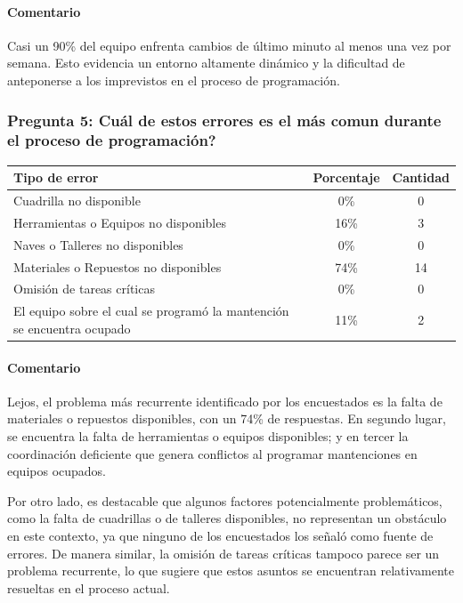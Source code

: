 \documentclass{article}
\begin{document}
\begin{appendix}
    \paragraph{Comentario} Casi un 90\% del equipo enfrenta cambios de último minuto al menos una vez por semana. Esto evidencia un entorno altamente dinámico y la dificultad de anteponerse a los imprevistos en el proceso de programación.
    
    
    \vspace{1.5em}
    \subsubsection*{Pregunta 5: Cuál de estos errores es el más comun durante el proceso de programación?}
    
    \begin{table}[htbp]
        \centering
        \begin{tabular}{p{7cm}cc}
            \toprule
            \textbf{Tipo de error} & \textbf{Porcentaje} & \textbf{Cantidad} \\
            \midrule
            Cuadrilla no disponible & 0\% & 0 \\
            Herramientas o Equipos no disponibles & 16\% & 3 \\
            Naves o Talleres no disponibles & 0\% & 0 \\
            Materiales o Repuestos no disponibles & 74\% & 14 \\
            Omisión de tareas críticas & 0\% & 0 \\
            El equipo sobre el cual se programó la mantención se encuentra ocupado & 11\% & 2 \\
            \bottomrule
        \end{tabular}
        \label{tab:errores_comunes}
    \end{table}
    
    \paragraph{Comentario} Lejos, el problema más recurrente identificado por los encuestados es la falta de materiales o repuestos disponibles, con un 74\% de respuestas. En segundo lugar, se encuentra la falta de herramientas o equipos disponibles; y en tercer la coordinación deficiente que genera conflictos al programar mantenciones en equipos ocupados.
    
    Por otro lado, es destacable que algunos factores potencialmente problemáticos, como la falta de cuadrillas o de talleres disponibles, no representan un obstáculo en este contexto, ya que ninguno de los encuestados los señaló como fuente de errores. De manera similar, la omisión de tareas críticas tampoco parece ser un problema recurrente, lo que sugiere que estos asuntos se encuentran relativamente resueltas en el proceso actual.
    

\end{appendix}
\end{document}
